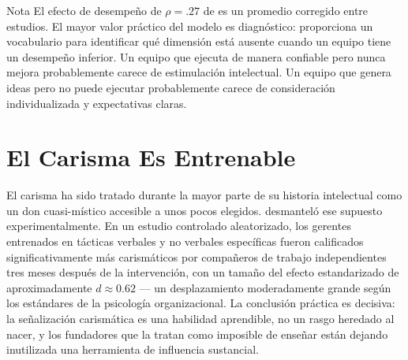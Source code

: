 \begin{admonition}{Nota}
El efecto de desempeño de \(\rho = .27\) de \textcite{judge2004transformational} es un promedio
corregido entre estudios. El mayor valor práctico del modelo es diagnóstico: proporciona un
vocabulario para identificar qué dimensión está ausente cuando un equipo tiene un desempeño
inferior. Un equipo que ejecuta de manera confiable pero nunca mejora probablemente carece de
estimulación intelectual. Un equipo que genera ideas pero no puede ejecutar probablemente carece
de consideración individualizada y expectativas claras.
\end{admonition}

\section{El Carisma Es Entrenable}\label{sec:charisma-tactics}

El carisma ha sido tratado durante la mayor parte de su historia intelectual como un don
cuasi-místico accesible a unos pocos elegidos. \textcite{antonakis2011charisma} desmanteló ese
supuesto experimentalmente. En un estudio controlado aleatorizado, los gerentes entrenados en
tácticas verbales y no verbales específicas fueron calificados significativamente más carismáticos
por compañeros de trabajo independientes tres meses después de la intervención, con un tamaño del
efecto estandarizado de aproximadamente
\(d \approx 0.62\) --- un desplazamiento moderadamente grande según los estándares de la
psicología organizacional. La conclusión práctica es decisiva: la señalización carismática es una
habilidad aprendible, no un rasgo heredado al nacer, y los fundadores que la tratan como
imposible de enseñar están dejando inutilizada una herramienta de influencia sustancial.

